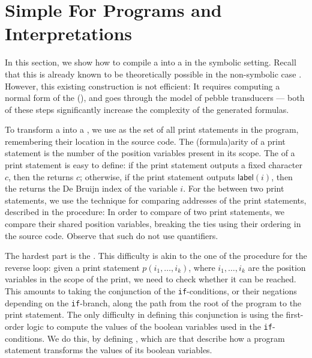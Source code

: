 \section{Simple For Programs and Interpretations}
\label{sec:low-level}

In this section, we show how to compile a  into
a  in the symbolic setting. Recall that
this is already known to be theoretically possible in the non-symbolic case
\cite{bojanczyk2018polyregular}. However, this existing construction 
is not efficient: It requires computing a normal form of the 
(\cite[Lemma~5.2]{bojanczyk2018polyregular}), and goes through
the model of pebble transducers \cite[Section~5]{bojanczyk2018polyregular} ---
both of these steps significantly increase the complexity of the generated formulas.

To transform a  into a ,
we use as  the set of all print statements in the program, remembering their
location in the source code. The \kl(formula){arity} of a print statement
is the number of the position variables present in its scope.
The  of a print statement is easy to define: if
the print statement outputs a fixed character $c$, then the  returns $c$; otherwise,
if the print statement outputs $\mathsf{label}(i)$,
then the  returns the De Bruijn index \cite{DEBRUJ72}
of the variable $i$. For the  between two print statements,
we use the technique for comparing addresses of the print statements, 
described in the  procedure:
In order to compare of two print statements, we compare 
their shared position variables,
breaking the ties using their ordering in the source code.
Observe that such  do not use quantifiers.

The hardest part is the . This difficulty is akin to the one of the
 procedure for the reverse loop: given a print
statement $p(i_1, \dots, i_k)$, where $i_1, \dots, i_k$ are the position
variables in the scope of the print, we need to check whether it can
be reached. This amounts to taking the conjunction of the \texttt{if}-conditions, 
or their negations depending on the \texttt{if}-branch, along the path
from the root of the program to the print statement.
The only difficulty in defining this conjunction is
using the first-order logic to compute the values
of the boolean variables used in the \texttt{if}-conditions. 
We do this, by defining
, which are  
that describe how a program statement transforms
the values of its boolean variables.

